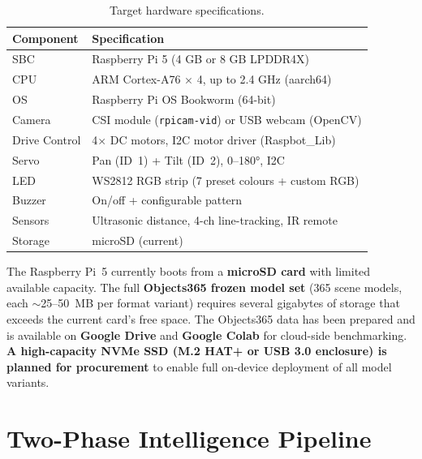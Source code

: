 \documentclass[12pt,a4paper]{article}
\begin{document}
\begin{table}[H]
\centering
\caption{Target hardware specifications.}
\label{tab:hardware}
\begin{tabular}{@{}ll@{}}
\toprule
\textbf{Component}     & \textbf{Specification} \\
\midrule
SBC                    & Raspberry Pi 5 (4 GB or 8 GB LPDDR4X) \\
CPU                    & ARM Cortex-A76 $\times$ 4, up to 2.4 GHz (aarch64) \\
OS                     & Raspberry Pi OS Bookworm (64-bit) \\
Camera                 & CSI module (\texttt{rpicam-vid}) or USB webcam (OpenCV) \\
Drive Control          & 4$\times$ DC motors, I2C motor driver (Raspbot\_Lib) \\
Servo                  & Pan (ID~1) + Tilt (ID~2), 0–180°, I2C \\
LED                    & WS2812 RGB strip (7 preset colours + custom RGB) \\
Buzzer                 & On/off + configurable pattern \\
Sensors                & Ultrasonic distance, 4-ch line-tracking, IR remote \\
Storage                & microSD (current) \\
\bottomrule
\end{tabular}
\end{table}

\begin{warnbox}
The Raspberry Pi~5 currently boots from a \textbf{microSD card} with limited
available capacity. The full \textbf{Objects365 frozen model set} (365 scene
models, each $\sim$25--50~MB per format variant) requires several gigabytes of
storage that exceeds the current card's free space. The Objects365 data has
been prepared and is available on \textbf{Google Drive} and \textbf{Google
Colab} for cloud-side benchmarking. \textbf{A high-capacity NVMe SSD (M.2
HAT+ or USB 3.0 enclosure) is planned for procurement} to enable full
on-device deployment of all model variants.
\end{warnbox}

\section{Two-Phase Intelligence Pipeline}
\end{document}
